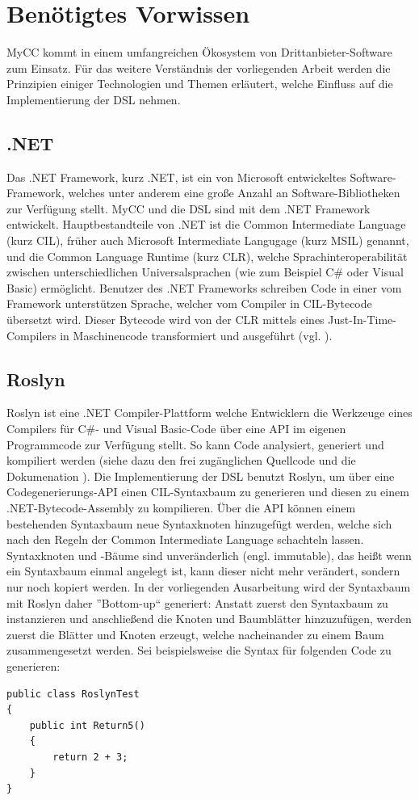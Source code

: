 \section{Benötigtes Vorwissen}
MyCC kommt in einem umfangreichen Ökosystem von Drittanbieter-Software zum Einsatz. Für das weitere Verständnis der vorliegenden Arbeit werden die Prinzipien einiger Technologien und Themen erläutert, welche Einfluss auf die Implementierung der DSL nehmen. 

\subsection{.NET}
\label{subsec:DotNet}
Das .NET Framework, kurz .NET, ist ein von Microsoft entwickeltes Software-Framework, welches unter anderem eine große Anzahl an Software-Bibliotheken zur Verfügung stellt. MyCC und die DSL sind mit dem .NET Framework entwickelt. Hauptbestandteile von .NET ist die Common Intermediate Language (kurz CIL), früher auch Microsoft Intermediate Langugage (kurz MSIL) genannt, und die Common Language Runtime (kurz CLR), welche Sprachinteroperabilität zwischen unterschiedlichen Universalsprachen (wie zum Beispiel C\# oder Visual Basic) ermöglicht. Benutzer des .NET Frameworks schreiben Code in einer vom Framework unterstützen Sprache, welcher vom Compiler in CIL-Bytecode übersetzt wird. Dieser Bytecode wird von der CLR mittels eines Just-In-Time-Compilers in Maschinencode transformiert und ausgeführt (vgl. \cite[S. 16ff]{Platt:03}).

\subsection{Roslyn}
\label{subsec:Roslyn}
Roslyn ist eine .NET Compiler-Plattform welche Entwicklern die Werkzeuge eines Compilers für C\#- und Visual Basic-Code über eine API im eigenen Programmcode zur Verfügung stellt. So kann Code analysiert, generiert und kompiliert werden (siehe dazu den frei zugänglichen Quellcode und die Dokumenation \cite{Roslyn}). Die Implementierung der DSL benutzt Roslyn, um über eine Codegenerierungs-API einen CIL-Syntaxbaum zu generieren und diesen zu einem .NET-Bytecode-Assembly zu kompilieren. Über die API können einem bestehenden Syntaxbaum neue Syntaxknoten hinzugefügt werden, welche sich nach den Regeln der Common Intermediate Language schachteln lassen. Syntaxknoten und -Bäume sind unveränderlich (engl. immutable), das heißt wenn ein Syntaxbaum einmal angelegt ist, kann dieser nicht mehr verändert, sondern nur noch kopiert werden. In der vorliegenden Ausarbeitung wird der Syntaxbaum mit Roslyn daher ''Bottom-up`` generiert: Anstatt zuerst den Syntaxbaum zu instanzieren und anschließend die Knoten und Baumblätter hinzuzufügen, werden zuerst die Blätter und Knoten erzeugt, welche nacheinander zu einem Baum zusammengesetzt werden. Sei beispielsweise die Syntax für folgenden Code zu generieren:
\noindent
\begin{lstlisting}[language=custom]
public class RoslynTest
{
    public int Return5()
    {
        return 2 + 3;
    }
}
\end{lstlisting}

